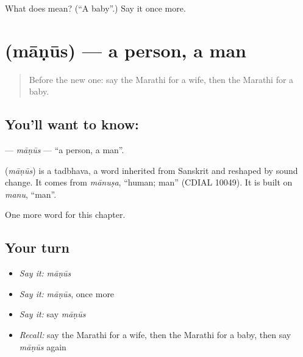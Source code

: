 \begin{tcolorbox}[breakable,colback=teal!4,colframe=teal!35!black,title={Before you move on}]
What does  mean? (\textquotedblleft{}A baby\textquotedblright{}.) Say it once more.
\end{tcolorbox}
\section[\texorpdfstring{\mr{माणूस} (māṇūs)}{माणूस (māṇūs)}]{ (māṇūs) — a person, a man}

\label{lesson:MR-C76-manus}



\begin{quote}
Before the new one: say the Marathi for a wife, then the Marathi for a baby.
\end{quote}

\subsection*{You'll want to know: }
\textbf{} — \emph{māṇūs} — \textquotedblleft{}a person, a man\textquotedblright{}.

\begin{cousinweb}
\textbf{} (\emph{māṇūs}) is a tadbhava, a word inherited from Sanskrit and reshaped by sound change. It comes from \emph{mānuṣa}, \textquotedblleft{}human; man\textquotedblright{} (CDIAL 10049). It is built on \emph{manu}, \textquotedblleft{}man\textquotedblright{}.
\end{cousinweb}

\begin{grammarlens}[title={What you've built}]
One more word for this chapter.
\end{grammarlens}

\subsection*{Your turn}
\begin{itemize}
\raggedright
  \item \emph{Say it:} \emph{māṇūs}
  \item \emph{Say it:} \emph{māṇūs}, once more
  \item \emph{Say it:} say \emph{māṇūs}
  \item \emph{Recall:} say the Marathi for a wife, then the Marathi for a baby, then say \emph{māṇūs} again
\end{itemize}

